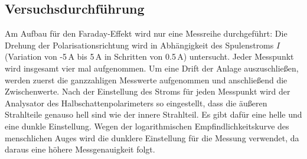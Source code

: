 \subsection{Versuchsdurchführung}

Am Aufbau für den Faraday-Effekt wird nur eine Messreihe durchgeführt:
Die Drehung der Polarisationsrichtung wird in Abhängigkeit des Spulenstroms $I$
(Variation von -5\,A bis 5\,A in Schritten von 0.5\,A) untersucht.
Jeder Messpunkt wird insgesamt vier mal aufgenommen.
Um eine Drift der Anlage auszuschließen,
werden zuerst die ganzzahligen Messwerte aufgenommen und anschließend die
Zwischenwerte.
Nach der Einstellung des Stroms für jeden Messpunkt wird der Analysator
des Halbschattenpolarimeters so eingestellt, dass die äußeren Strahlteile genauso hell sind wie der innere
Strahlteil.
Es gibt dafür eine helle und eine dunkle Einstellung.
Wegen der logarithmischen Empfindlichkeitskurve des menschlichen Auges wird die dunklere Einstellung
für die Messung verwendet, da daraus eine höhere Messgenauigkeit folgt.
